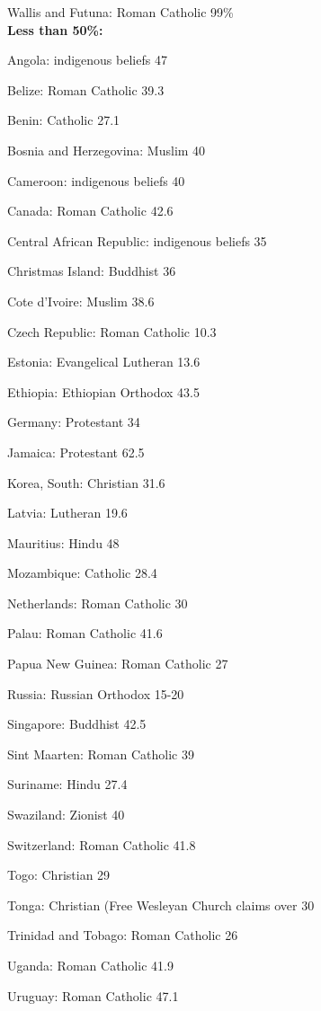 \documentclass[letterpaper]{article}
\begin{document}
\begin{enumerate}
Wallis and Futuna: Roman Catholic 99\% \\

\newpage
\textbf{Less than 50\%:}

Angola: indigenous beliefs 47%

Belize: Roman Catholic 39.3%

Benin: Catholic 27.1%

Bosnia and Herzegovina: Muslim 40%

Cameroon: indigenous beliefs 40%

Canada: Roman Catholic 42.6%

Central African Republic: indigenous beliefs 35%

Christmas Island: Buddhist 36%

Cote d'Ivoire: Muslim 38.6%

Czech Republic: Roman Catholic 10.3%

Estonia: Evangelical Lutheran 13.6%

Ethiopia: Ethiopian Orthodox 43.5%

Germany: Protestant 34%

Jamaica: Protestant 62.5%

Korea, South: Christian 31.6%

Latvia: Lutheran 19.6%

Mauritius: Hindu 48%

Mozambique: Catholic 28.4%

Netherlands: Roman Catholic 30%

Palau: Roman Catholic 41.6%

Papua New Guinea: Roman Catholic 27%

Russia: Russian Orthodox 15-20%

Singapore: Buddhist 42.5%

Sint Maarten: Roman Catholic 39%

Suriname: Hindu 27.4%

Swaziland: Zionist 40%

Switzerland: Roman Catholic 41.8%

Togo: Christian 29%

Tonga: Christian (Free Wesleyan Church claims over 30

Trinidad and Tobago: Roman Catholic 26%

Uganda: Roman Catholic 41.9%

Uruguay: Roman Catholic 47.1%


\end{enumerate}
\end{document}
